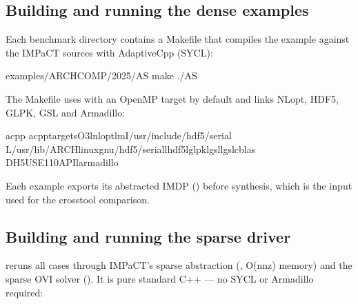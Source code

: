 \documentclass[a4paper,10pt,english]{sphinxmanual}
\begin{document}
\subsection{Building and running the dense examples}
\label{\detokenize{benchmarks/index:building-and-running-the-dense-examples}}
\sphinxAtStartPar
Each benchmark directory contains a Makefile that compiles the example against the
IMPaCT sources with AdaptiveCpp (SYCL):

\begin{sphinxVerbatim}[commandchars=\\\{\}]
examples/ARCH\PYGZhy{}COMP/2025/AS
make
./AS
\end{sphinxVerbatim}

\sphinxAtStartPar
The Makefile uses  with an OpenMP target by default and links NLopt, HDF5, GLPK,
GSL and Armadillo:

\begin{sphinxVerbatim}[commandchars=\\\{\}]
acpp
\PYGZhy{}\PYGZhy{}acpp\PYGZhy{}targets\PYGZhy{}O3\PYGZhy{}lnlopt\PYGZhy{}lm\PYGZhy{}I/usr/include/hdf5/serial
\PYGZhy{}L/usr/lib/ARCH\PYGZhy{}linux\PYGZhy{}gnu/hdf5/serial\PYGZhy{}lhdf5\PYGZhy{}lglpk\PYGZhy{}lgsl\PYGZhy{}lgslcblas
\PYGZhy{}DH5\PYGZus{}USE\PYGZus{}110\PYGZus{}API\PYGZhy{}larmadillo
\end{sphinxVerbatim}

\sphinxAtStartPar
Each example exports its abstracted IMDP () before
synthesis, which is the input used for the cross\sphinxhyphen{}tool comparison.


\subsection{Building and running the sparse driver}
\label{\detokenize{benchmarks/index:building-and-running-the-sparse-driver}}
\sphinxAtStartPar
{} re\sphinxhyphen{}runs all cases through IMPaCT’s sparse abstraction
(, O(nnz) memory) and the sparse OVI solver (). It
is pure standard C++ — no SYCL or Armadillo required:
\end{document}
